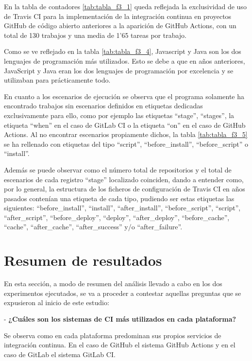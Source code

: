 En la tabla de contadores \ref{tab:tabla_f3_1} queda reflejada la exclusividad de uso de Travis CI para la implementación de la integración continua en proyectos GitHub de código abierto anteriores a la aparición de GitHub Actions, con un total de 130 trabajos y una media de 1'65 tareas por trabajo.

Como se ve reflejado en la tabla \ref{tab:tabla_f3_4}, Javascript y Java son los dos lenguajes de programación más utilizados. Esto se debe a que en años anteriores, JavaScript y Java eran los dos lenguajes de programación por excelencia y se utilizaban para prácticamente todo.

En cuanto a los escenarios de ejecución se observa que el programa solamente ha encontrado trabajos sin escenarios definidos en etiquetas dedicadas exclusivamente para ello, como por ejemplo las etiquetas ``stage'', ``stages'', la etiqueta ``when'' en el caso de GitLab CI o la etiqueta ``on'' en el caso de GitHub Actions. Al no encontrar escenarios propiamente dichos, la tabla \ref{tab:tabla_f3_5} se ha rellenado con etiquetas del tipo ``script'', ``before\_install'', ``before\_script'' o ``install''.

Además se puede observar como el número total de repositorios y el total de escenarios de cada registro ``stage'' localizado coinciden, dando a entender como, por lo general, la estructura de los ficheros de configuración de Travis CI en años pasados contenían una etiqueta de cada tipo, pudiendo ser estas etiquetas las siguientes: ``before\_install'', ``install'', ``after\_install'', ``before\_script'', ``script'', ``after\_script'', ``before\_deploy'', ``deploy'', ``after\_deploy'', ``before\_cache'', ``cache'', ``after\_cache'', ``after\_success'' y/o ``after\_failure''.

\section{Resumen de resultados}
En esta sección, a modo de resumen del análisis llevado a cabo en los dos experimentos ejecutados, se va a proceder a contestar aquellas preguntas que se expusieron al inicio de este estudio:

- \textbf{¿Cuáles son los sistemas de CI más utilizados en cada plataforma?}

Se observa como en cada plataforma predominan sus propios servicios de integración continua. En el caso de GitHub el sistema GitHub Actions y en el caso de GitLab el sistema GitLab CI.

